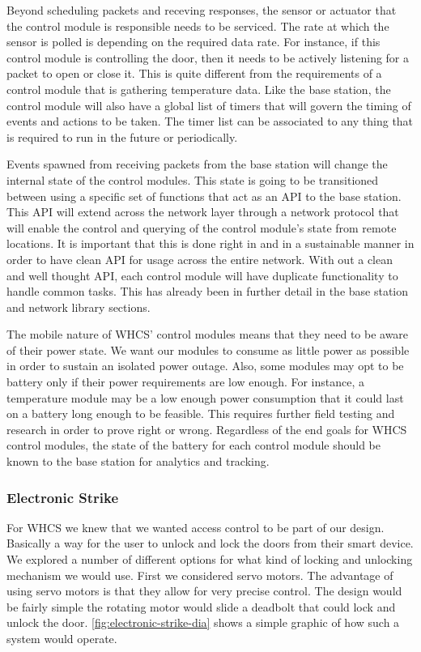 Beyond scheduling packets and receving responses, the sensor or actuator that
the control module is responsible needs to be serviced. The rate at which the
sensor is polled is depending on the required data rate. For instance, if this
control module is controlling the door, then it needs to be actively listening
for a packet to open or close it. This is quite different from the requirements
of a control module that is gathering temperature data. Like the base station,
the control module will also have a global list of timers that will govern the
timing of events and actions to be taken. The timer list can be associated to
any thing that is required to run in the future or periodically.

Events spawned from receiving packets from the base station will change the
internal state of the control modules. This state is going to be transitioned
between using a specific set of functions that act as an API to the base
station. This API will extend across the network layer through a network
protocol that will enable the control and querying of the control module's state
from remote locations. It is important that this is done right in and in a
sustainable manner in order to have clean API for usage across the entire
network. With out a clean and well thought API, each control module will have
duplicate functionality to handle common tasks. This has already been in
further detail in the base station and network library sections.

The mobile nature of WHCS' control modules means that they need to be aware of
their power state. We want our modules to consume as little power as possible
in order to sustain an isolated power outage. Also, some modules may opt to be
battery only if their power requirements are low enough. For instance, a
temperature module may be a low enough power consumption that it could last on
a battery long enough to be feasible. This requires further field testing and
research in order to prove right or wrong. Regardless of the end goals for WHCS
control modules, the state of the battery for each control module should be
known to the base station for analytics and tracking.

\subsubsection{Electronic Strike}

\label{sec:electronic-strike}

For WHCS we knew that we wanted access control to be part of our design.
Basically a way for the user to unlock and lock the doors from their smart
device. We explored a number of different options for what kind of locking and
unlocking mechanism we would use. First we considered servo motors. The
advantage of using servo motors is that they allow for very precise control.
The design would be fairly simple the rotating motor would slide a deadbolt
that could lock and unlock the door. \autoref{fig:electronic-strike-dia} shows a simple
graphic of how such a system would operate.

